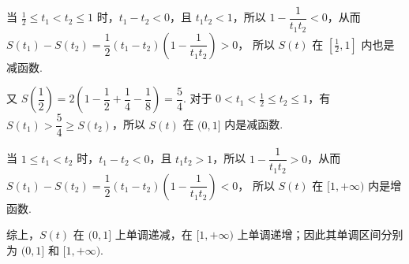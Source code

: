 \begin{solution}
\begin{enumerate}
当 \(\frac12\le t_1<t_2\le1\) 时，\(t_1-t_2<0\)，且 \(t_1t_2<1\)，所以 \(1-\dfrac{1}{t_1t_2}<0\)，从而
\(S(t_1)-S(t_2)=\dfrac12(t_1-t_2)\left(1-\dfrac{1}{t_1t_2}\right)>0\)，
所以 \(S(t)\) 在 \([\frac12,1]\) 内也是减函数.

又
\(S\!\left(\dfrac12\right)=2\left(1-\dfrac12+\dfrac14-\dfrac18\right)=\dfrac54\).
对于 \(0<t_1<\frac12\le t_2\le1\)，有 \(S(t_1)>\dfrac54\ge S(t_2)\)，所以 \(S(t)\) 在 \((0,1]\) 内是减函数.

当 \(1\le t_1<t_2\) 时，\(t_1-t_2<0\)，且 \(t_1t_2>1\)，所以 \(1-\dfrac{1}{t_1t_2}>0\)，从而
\(S(t_1)-S(t_2)=\dfrac12(t_1-t_2)\left(1-\dfrac{1}{t_1t_2}\right)<0\)，
所以 \(S(t)\) 在 \([1,+\infty)\) 内是增函数.

综上，\(S(t)\) 在 \((0,1]\) 上单调递减，在 \([1,+\infty)\) 上单调递增；因此其单调区间分别为 \((0,1]\) 和 \([1,+\infty)\).
\end{enumerate}
\end{solution}
